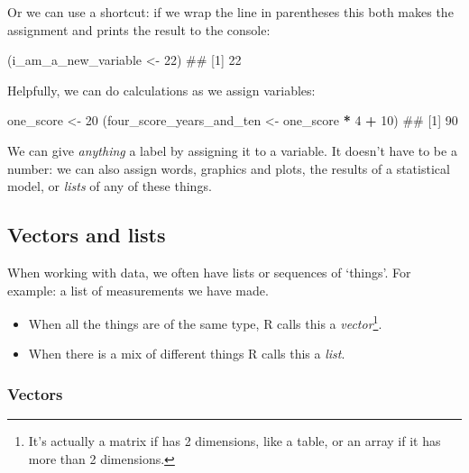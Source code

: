 \documentclass[]{article}
\newenvironment{Shaded}{\begin{snugshade}}{\end{snugshade}}
\newcommand{\DecValTok}[1]{\textcolor[rgb]{0.00,0.00,0.81}{#1}}
\newcommand{\StringTok}[1]{\textcolor[rgb]{0.31,0.60,0.02}{#1}}
\newcommand{\OperatorTok}[1]{\textcolor[rgb]{0.81,0.36,0.00}{\textbf{#1}}}
\newcommand{\NormalTok}[1]{#1}
\let\rmarkdownfootnote\footnote%
\def\footnote{\protect\rmarkdownfootnote}
\theoremstyle{definition}
\theoremstyle{definition}
\theoremstyle{definition}
\theoremstyle{remark}
\begin{document}
Or we can use a shortcut: if we wrap the line in parentheses this both
makes the assignment and prints the result to the console:

\begin{Shaded}
\begin{Highlighting}[]
\NormalTok{(i_am_a_new_variable <-}\StringTok{ }\DecValTok{22}\NormalTok{)}
\NormalTok{## [1] 22}
\end{Highlighting}
\end{Shaded}

Helpfully, we can do calculations as we assign variables:

\begin{Shaded}
\begin{Highlighting}[]
\NormalTok{one_score <-}\StringTok{ }\DecValTok{20}
\NormalTok{(four_score_years_and_ten <-}\StringTok{ }\NormalTok{one_score }\OperatorTok{*}\StringTok{ }\DecValTok{4} \OperatorTok{+}\StringTok{ }\DecValTok{10}\NormalTok{)}
\NormalTok{## [1] 90}
\end{Highlighting}
\end{Shaded}

{We can give \emph{anything} a label by assigning it to a variable. It
doesn't have to be a number: we can also assign words, graphics and
plots, the results of a statistical model, or \emph{lists} of any of
these things.}

\hypertarget{vectors-and-lists}{\subsection*{Vectors and
lists}\label{vectors-and-lists}}

When working with data, we often have lists or sequences of `things'.
For example: a list of measurements we have made.

\begin{itemize}
\item
  When all the things are of the same type, R calls this a
  \emph{vector}\footnote{It's actually a matrix if has 2 dimensions,
    like a table, or an array if it has more than 2 dimensions.}.
\item
  When there is a mix of different things R calls this a \emph{list}.
\end{itemize}

\subsubsection*{Vectors}\label{vector}
\end{document}
